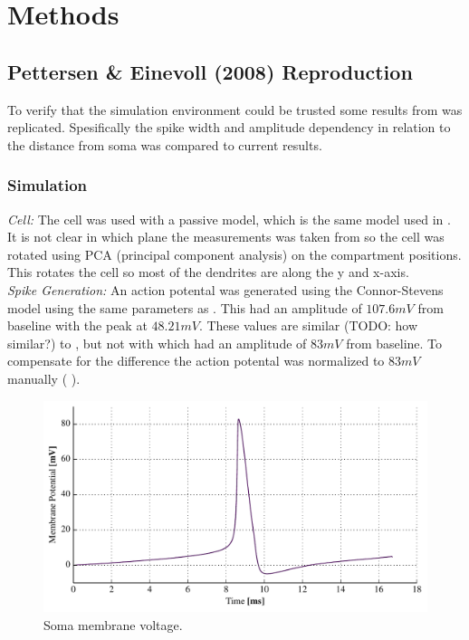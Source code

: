 \documentclass[altfont, fleqn]{uiophd}
\renewcommand{\cref}[1]{{\color{viridis_03}\mycref{#1}} }
\begin{document}
\chapter{Methods}
\vspace{1em} 
\startcontents
{}
\section{Pettersen \& Einevoll (2008) Reproduction}
To verify that the simulation environment could be trusted 
some results from 
\textcite{pettersen_amplitude_2008} was replicated.
Spesifically the spike width and amplitude dependency in relation to 
the distance from soma was compared to current results. 


\subsection{Simulation}
\emph{Cell:}
The \textcite{mainen_influence_1996} cell was used with a passive model, which is 
the same model used in \textcite{pettersen_amplitude_2008}. 
It is not clear in which plane the measurements was taken from so 
the cell was rotated using PCA (principal component analysis) on the compartment
positions.
This rotates the cell so most of the dendrites are along
the y and x-axis. 
\\

\noindent\emph{Spike Generation:}
An action potental was generated using the Connor-Stevens model 
\cites{connor_prediction_1971, connor_neural_1977}
using the same parameters as \textcite{dayan_theoretical_2001}. 
This had an amplitude of $107.6mV$ from baseline with the peak at $48.21mV$. 
These values are similar (TODO: how similar?) to \textcite{dayan_theoretical_2001}, but not
with \textcite{pettersen_amplitude_2008} which had an amplitude of 
$83mV$ from baseline. To compensate for the difference the action potental was 
normalized to $83mV$ manually (\cref{fig:3_1_soma_mem}).
\\

\begin{figure}[h]
\centering
\includegraphics[width=1\textwidth]{images/3_methods/3_1_reproduction/soma_mem.pdf}
\caption{Soma membrane voltage. }
\label{fig:3_1_soma_mem}
\end{figure}
\end{document}
